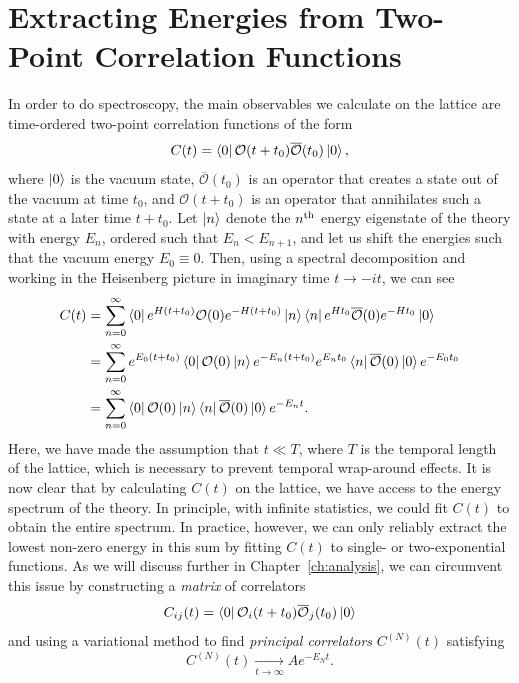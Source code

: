 \section{Extracting Energies from Two-Point Correlation Functions}\label{sec:intro_corr}
In order to do spectroscopy, the main observables we calculate on the lattice are time-ordered two-point correlation functions of the form
\begin{equation}
    C(t) = \bra 0 \mathcal O (t+t_0) \overline{\mathcal O}(t_0) \ket 0,
\end{equation}
where $\ket 0$ is the vacuum state, $\overline{\mathcal O}(t_0)$ is an operator that creates a state out of the vacuum at time $t_0$, and $\mathcal O (t+t_0)$ is an operator that annihilates such a state at a later time $t+t_0$. Let $\ket n$ denote the $n^{\rm{th}}$ energy eigenstate of the theory with energy $E_n$, ordered such that $E_n < E_{n+1}$, and let us shift the energies such that the vacuum energy $E_0 \equiv 0$. Then, using a spectral decomposition and working in the Heisenberg picture in imaginary time $t\rightarrow -it$, we can see
\begin{equation}\label{eq:corr_decomp}
    \begin{aligned}
        C(t) &= \sum_{n=0}^\infty \bra 0 e^{H(t+t_0)} \mathcal O(0) e^{-H(t+t_0)} \ket n \bra n e^{H t_0} \overline{\mathcal O}(0)e^{-H t_0} \ket 0 \\
        &=\sum_{n=0}^\infty e^{E_0(t+t_0)} \bra 0 \mathcal O(0) \ket n e^{-E_n(t+t_0)} e^{E_n t_0} \bra n \overline{\mathcal O}(0) \ket 0 e^{-E_0 t_0}\\
        & = \sum_{n=0}^\infty \bra 0 \mathcal O(0) \ket n \bra n \overline{\mathcal O}(0)\ket 0 e^{-E_n t}.
    \end{aligned}
\end{equation}
Here, we have made the assumption that $t \ll T$, where $T$ is the temporal length of the lattice, which is necessary to prevent temporal wrap-around effects. It is now clear that by calculating $C(t)$ on the lattice, we have access to the energy spectrum of the theory. In principle, with infinite statistics, we could fit $C(t)$ to obtain the entire spectrum. In practice, however, we can only reliably extract the lowest non-zero energy in this sum by fitting $C(t)$ to single- or two-exponential functions. As we will discuss further in Chapter~\ref{ch:analysis}, we can circumvent this issue by constructing a \emph{matrix} of correlators
\begin{equation}
    C_{ij}(t) = \bra 0 \mathcal O_i(t+t_0) \overline{\mathcal O}_j(t_0) \ket 0
\end{equation}
and using a variational method to find \emph{principal correlators} $C^{(N)}(t)$ satisfying
\begin{equation}
    C^{(N)}(t) \xrightarrow[t\rightarrow \infty]{} A e^{-E_N t}.
\end{equation}

